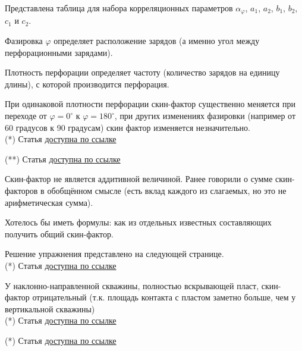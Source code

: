 \documentclass[main.tex]{subfiles}
\begin{document}

Представлена таблица для набора корреляционных параметров $\alpha_\varphi$, $a_1$, $a_2$, $b_1$, $b_2$, $c_1$ и $c_2$.

Фазировка $\varphi$ определяет расположение зарядов (а именно угол между перфорационными зарядами).

Плотность перфорации определяет частоту (количество зарядов на единицу длины), с которой производится перфорация.

При одинаковой плотности перфорации скин-фактор существенно меняется при переходе от $\varphi=0^{\circ}$ к $\varphi=180^{\circ}$, при других изменениях фазировки (например от 60 градусов к 90 градусам) скин фактор изменяется незначительно.\\

(*) Статья \href{https://mualal.github.io/source/tex/hydrocarbons2022/articles/papatzacos1987.pdf}{доступна по ссылке}

(**) Статья \href{https://mualal.github.io/source/tex/hydrocarbons2022/articles/vrbik1991.pdf}{доступна по ссылке}


Скин-фактор не является аддитивной величиной. Ранее говорили о сумме скин-факторов в обобщённом смысле (есть вклад каждого из слагаемых, но это не арифметическая сумма).

Хотелось бы иметь формулы: как из отдельных известных составляющих получить общий скин-фактор.

Решение упражнения представлено на следующей странице.\\

(*) Статья \href{https://mualal.github.io/source/tex/hydrocarbons2022/articles/yildiz2006.pdf}{доступна по ссылке}




У наклонно-направленной скважины, полностью вскрывающей пласт, скин-фактор отрицательный (т.к. площадь контакта с пластом заметно больше, чем у вертикальной скважины)\\

(*) Статья \href{https://mualal.github.io/source/tex/hydrocarbons2022/articles/yildiz2006.pdf}{доступна по ссылке}


(*) Статья \href{https://mualal.github.io/source/tex/hydrocarbons2022/articles/yildiz2006.pdf}{доступна по ссылке}
\end{document}
